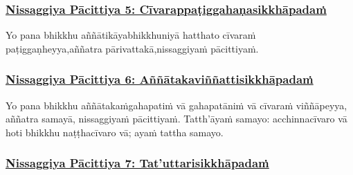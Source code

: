 \subsubsection*{\hyperref[forf-exp5]{Nissaggiya Pācittiya 5: Cīvarappaṭiggahaṇasikkhāpadaṁ}}
\label{np5}

Yo pana bhikkhu aññātikāya\makeatletter\hyperlink{endnote131-appendix}\makeatother \thinspace bhikkhuniyā hatthato cīvaraṁ paṭiggaṇheyya,\makeatletter\hyperlink{endnote132-appendix}\makeatother \thinspace aññatra pārivattakā,\makeatletter\hyperlink{endnote133-appendix}\makeatother \thinspace nissaggiyaṁ pācittiyaṁ.



\subsubsection*{\hyperref[forf-exp6]{Nissaggiya Pācittiya 6: Aññātakaviññattisikkhāpadaṁ}}
\label{np6}

Yo pana bhikkhu aññātakaṁ\makeatletter\hyperlink{endnote134-appendix}\makeatother \thinspace gahapatiṁ vā gahapatāniṁ vā cīvaraṁ viññāpeyya, aññatra samayā, nissaggiyaṁ pācittiyaṁ. Tatth'āyaṁ samayo: acchinnacīvaro vā hoti bhikkhu naṭṭhacīvaro vā; ayaṁ tattha samayo.



\subsubsection*{\hyperref[forf-exp7]{Nissaggiya Pācittiya 7: Tat'uttarisikkhāpadaṁ}}
\label{np7}

